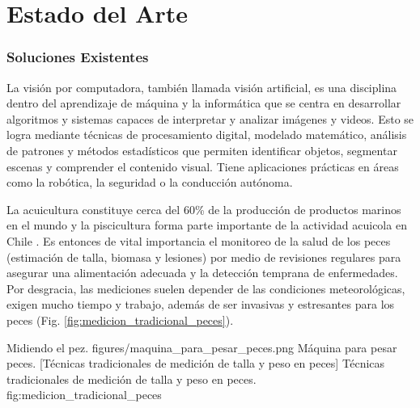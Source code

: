 \part*{Estado del Arte}
\section{Soluciones Existentes}
La visión por computadora, también llamada visión artificial, es una disciplina dentro del aprendizaje de máquina y la informática que se centra en desarrollar algoritmos y sistemas capaces de interpretar y analizar imágenes y videos. Esto se logra mediante técnicas de procesamiento digital, modelado matemático, análisis de patrones y métodos estadísticos que permiten identificar objetos, segmentar escenas y comprender el contenido visual. Tiene aplicaciones prácticas en áreas como la robótica, la seguridad o la conducción autónoma.

La acuicultura constituye cerca del 60\% de la producción de productos marinos en el mundo \cite{FAO2024} y la piscicultura forma parte importante de la actividad acuicola en Chile \cite{chile2017levantamiento}. Es entonces de vital importancia el monitoreo de la salud de los peces (estimación de talla, biomasa y lesiones) por medio de revisiones regulares para asegurar una alimentación adecuada y la detección temprana de enfermedades. Por desgracia, las mediciones suelen depender de las condiciones meteorológicas, exigen mucho tiempo y trabajo, además de ser invasivas y estresantes para los peces \cite{Tonachella2022} (Fig. \ref{fig:medicion_tradicional_peces}).

{Midiendo el pez.\label{fig:midiendo_pez}}%
{figures/maquina_para_pesar_peces.png}%
{Máquina para pesar peces.\label{fig:maquina_para_pesar_peces}}%
[Técnicas tradicionales de medición de talla y peso en peces]%
{Técnicas tradicionales de medición de talla y peso en peces.}%
{fig:medicion_tradicional_peces}%
    
